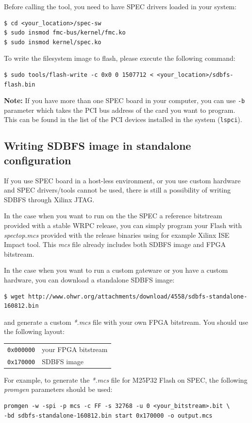 \documentclass[a4paper, 12pt]{article}
\renewcommand{\_}{\underscore\allowbreak}
\newcommand{\code}[1]{\texttt{#1}}
\begin{document}
Before calling the tool, you need to have SPEC drivers loaded in your system:
\begin{lstlisting}
$ cd <your_location>/spec-sw
$ sudo insmod fmc-bus/kernel/fmc.ko
$ sudo insmod kernel/spec.ko
\end{lstlisting}

To write the filesystem image to flash, please execute the following
command:
\begin{lstlisting}
$ sudo tools/flash-write -c 0x0 0 1507712 < <your_location>/sdbfs-flash.bin
\end{lstlisting}

\noindent\textbf{Note:} If you have more than one SPEC board in your computer,
you can use \code{-b} parameter which takes the PCI bus address of the card you
want to program. This can be found in the list of the PCI devices installed in
the system (\code{lspci}).

\subsection{Writing SDBFS image in standalone configuration}

If you use SPEC board in a host-less environment, or you use custom
hardware and SPEC drivers/tools cannot be used, there is still a
possibility of writing SDBFS through Xilinx JTAG.

\vspace{1em}
In the case when you want to run on the the SPEC a reference bitstream provided with a stable
WRPC release, you can simply program your Flash with \textit{spec\_top.mcs}
provided with the release binaries using for example Xilinx ISE Impact tool.
This \textit{mcs} file already includes both SDBFS image and FPGA bitstream.

In the case when you want to run a custom gateware or you have a custom hardware, you can 
download a standalone SDBFS image:
\begin{lstlisting}
$ wget http://www.ohwr.org/attachments/download/4558/sdbfs-standalone-160812.bin
\end{lstlisting}
and generate a custom \textit{*.mcs} file with your own FPGA bitstream. You should
use the following layout:
\begin{longtable}{  l  l }
\code{0x000000} & your FPGA bitstream \\
\code{0x170000} & SDBFS image\\
\end{longtable}

For example, to generate the \textit{*.mcs} file for M25P32 Flash on SPEC, the
following \textit{promgen} parameters should be used:
\begin{lstlisting}
promgen -w -spi -p mcs -c FF -s 32768 -u 0 <your_bitstream>.bit \
-bd sdbfs-standalone-160812.bin start 0x170000 -o output.mcs
\end{lstlisting}
\end{document}
